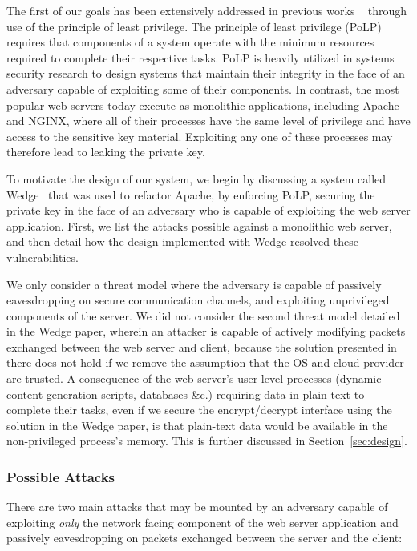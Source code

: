 \documentclass[../main.tex]{subfiles}
\begin{document}
The first of our goals has been extensively addressed in previous
works ~\cite{Bittau08, Krohn2004} through use of the principle of
least privilege. The principle of least privilege (PoLP) requires
that components of a system operate with the minimum resources
required to complete their respective tasks. PoLP is heavily utilized
in systems security research to design systems that maintain their
integrity in the face of an adversary capable of exploiting some of
their components. In contrast, the most popular web servers today
execute as monolithic applications, including Apache and NGINX, where
all of their processes have the same level of privilege and have
access to the sensitive key material. Exploiting any one of these
processes may therefore lead to leaking the private key.

To motivate the design of our system, we begin by discussing a system
called Wedge~\cite{Bittau08} that was used to refactor Apache, by
enforcing PoLP, securing the private key in the face of an adversary
who is capable of exploiting the web server application. First, we
list the attacks possible against a monolithic web server, and then
detail how the design implemented with Wedge resolved these
vulnerabilities.

We only consider a threat model where the adversary is capable of
passively eavesdropping on secure communication channels, and
exploiting unprivileged components of the server. We did not consider
the second threat model detailed in the Wedge paper, wherein an
attacker is capable of actively modifying packets exchanged between
the web server and client, because the solution presented in there
does not hold if we remove the assumption that the OS and cloud
provider are trusted. A consequence of the web server's user-level
processes (dynamic content generation scripts, databases \&c.)
requiring data in plain-text to complete their tasks, even if we secure
the encrypt/decrypt interface using the solution in the Wedge paper,
is that plain-text data would be available in the non-privileged process's
memory. This is further discussed in Section~\ref{sec:design}.

\subsubsection*{Possible Attacks}

There are two main attacks that may be mounted by an adversary capable
of exploiting \textit{only} the network facing component of the web
server application and passively eavesdropping on packets exchanged
between the server and the client:
\end{document}
